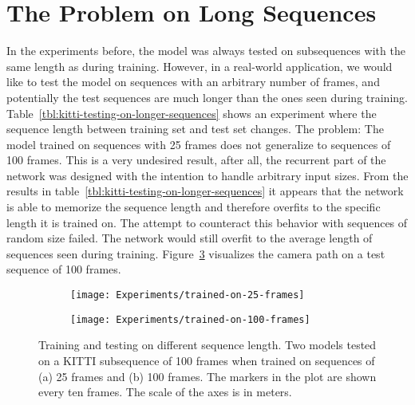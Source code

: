 	\section{The Problem on Long Sequences}
		In the experiments before, the model was always tested on subsequences with the same length as during training.
		However, in a real-world application, we would like to test the model on sequences with an arbitrary number of frames, and potentially the test sequences are much longer than the ones seen during training.
		Table~\ref{tbl:kitti-testing-on-longer-sequences} shows an experiment where the sequence length between training set and test set changes.
		The problem: The model trained on sequences with 25 frames does not generalize to sequences of 100 frames.
		This is a very undesired result, after all, the recurrent part of the network was designed with the intention to handle arbitrary input sizes.
		From the results in table~\ref{tbl:kitti-testing-on-longer-sequences} it appears that the network is able to memorize the sequence length and therefore overfits to the specific length it is trained on.
		The attempt to counteract this behavior with sequences of random size failed.
		The network would still overfit to the average length of sequences seen during training.
		Figure~\ref{fig:kitti-testing-on-longer-sequences} visualizes the camera path on a test sequence of 100 frames.
		\begin{figure}
			\centering
			\begin{subfigure}[b]{0.5\linewidth}
				\centering
				\texttt{[image: Experiments/trained-on-25-frames]}
				\caption{
					\label{fig:0}
				}
			\end{subfigure}%
			\begin{subfigure}[b]{0.5\linewidth}
				\centering
				\texttt{[image: Experiments/trained-on-100-frames]}
				\caption{
					\label{fig:1}
				}
			\end{subfigure}%
			\caption[Training and testing on different sequence length]
					{Training and testing on different sequence length. 
					 Two models tested on a KITTI subsequence of 100 frames when trained on sequences of (a) 25 frames and (b) 100 frames. 
					 The markers in the plot are shown every ten frames.
					 The scale of the axes is in meters.
					 \label{fig:kitti-testing-on-longer-sequences}}
		\end{figure}
